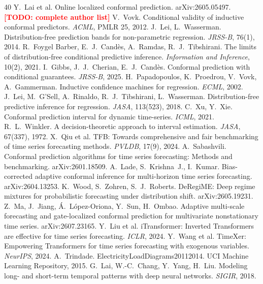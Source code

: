 \documentclass[11pt]{article}
\newcommand{\todo}[1]{\textcolor{red}{\textbf{[TODO: #1]}}}
\begin{document}
\begin{thebibliography}{40}
 Y.~Lai et al. Online localized conformal prediction. arXiv:2605.05497. \todo{complete author list}
 V.~Vovk. Conditional validity of inductive conformal predictors. \emph{ACML}, PMLR 25, 2012.
 J.~Lei, L.~Wasserman. Distribution-free prediction bands for non-parametric regression. \emph{JRSS-B}, 76(1), 2014.
 R.~Foygel Barber, E.~J.~Cand\`es, A.~Ramdas, R.~J.~Tibshirani. The limits of distribution-free conditional predictive inference. \emph{Information and Inference}, 10(2), 2021.
 I.~Gibbs, J.~J.~Cherian, E.~J.~Cand\`es. Conformal prediction with conditional guarantees. \emph{JRSS-B}, 2025.
 H.~Papadopoulos, K.~Proedrou, V.~Vovk, A.~Gammerman. Inductive confidence machines for regression. \emph{ECML}, 2002.
 J.~Lei, M.~G'Sell, A.~Rinaldo, R.~J.~Tibshirani, L.~Wasserman. Distribution-free predictive inference for regression. \emph{JASA}, 113(523), 2018.
 C.~Xu, Y.~Xie. Conformal prediction interval for dynamic time-series. \emph{ICML}, 2021.
 R.~L.~Winkler. A decision-theoretic approach to interval estimation. \emph{JASA}, 67(337), 1972.
 X.~Qiu et al. TFB: Towards comprehensive and fair benchmarking of time series forecasting methods. \emph{PVLDB}, 17(9), 2024.
 A.~Sabashvili. Conformal prediction algorithms for time series forecasting: Methods and benchmarking. arXiv:2601.18509.
 A.~Lade, S.~Krishna~J., I.~Kumar. Bias-corrected adaptive conformal inference for multi-horizon time series forecasting. arXiv:2604.13253.
 K.~Wood, S.~Zohren, S.~J.~Roberts. DeRegiME: Deep regime mixtures for probabilistic forecasting under distribution shift. arXiv:2605.19231.
 Z.~Ma, J.~Jiang, \'A.~L\'opez-Oriona, Y.~Sun, H.~Ombao. Adaptive multi-scale forecasting and gate-localized conformal prediction for multivariate nonstationary time series. arXiv:2607.23165.
 Y.~Liu et al. iTransformer: Inverted Transformers are effective for time series forecasting. \emph{ICLR}, 2024.
 Y.~Wang et al. TimeXer: Empowering Transformers for time series forecasting with exogenous variables. \emph{NeurIPS}, 2024.
 A.~Trindade. ElectricityLoadDiagrams20112014. UCI Machine Learning Repository, 2015.
 G.~Lai, W.-C.~Chang, Y.~Yang, H.~Liu. Modeling long- and short-term temporal patterns with deep neural networks. \emph{SIGIR}, 2018.
\end{thebibliography}
\end{document}
